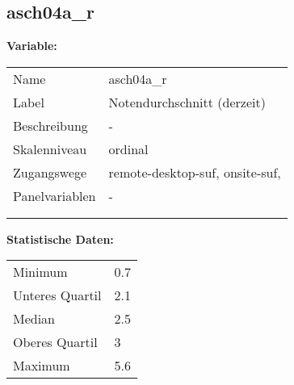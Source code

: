 	
	
	\subsection{asch04a\_r}
	\label{subSection:asch04a_r}

	\noindent\textbf{Variable:}\\
		\begin{tabular}{lL{11.3cm}}
			\label{tableVariable:asch04a_r}
			Name & asch04a\_r \\
			Label & Notendurchschnitt (derzeit) \\
			Beschreibung & - \\
			Skalenniveau & ordinal \\
			Zugangswege &
				remote-desktop-suf,
				onsite-suf,
 \\
			Panelvariablen & -
			 \\
			 \\
 \\
		\end{tabular}



		\vspace*{1 cm}
		\noindent\textbf{Statistische Daten:}\\
			\begin{tabular}{ll}
				\label{tableStatistics:asch04a_r}
					Minimum & 0.7 \\
					Unteres Quartil & 2.1 \\
					Median & 2.5 \\
					Oberes Quartil & 3 \\
					Maximum & 5.6 \\
			\end{tabular}



